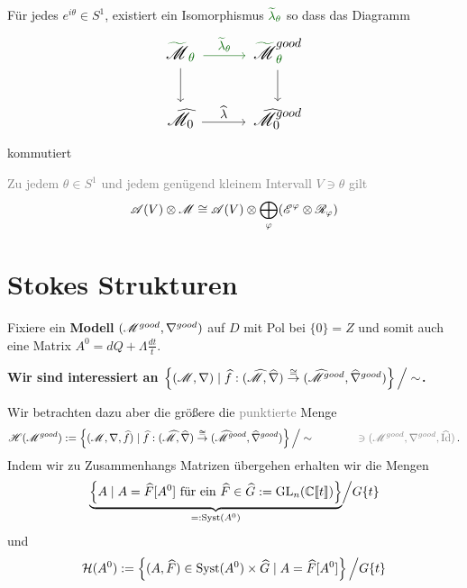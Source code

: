 \begin{paracol}{2} %
  \begin{thm}
    Für jedes $e^{i\theta}\in S^1$, existiert ein Isomorphismus
    $\textcolor{green!40!black}{\tilde\lambda_\theta}$ so dass das Diagramm
    \[ \Large\begin{tikzcd}
        \textcolor{green!40!black}{\tilde{\textcolor{black}{\sM}}_\theta}
        \dar \rar[green!40!black]{\tilde\lambda_\theta}&
        \textcolor{green!40!black}{%
        \tilde{\textcolor{black}{\sM}}_\theta^{\textcolor{black}{good}}}\dar
        \\\hat\sM_0 \rar{\hat\lambda} &
        \hat\sM_0^{good}
    \end{tikzcd} \]
    kommutiert
  \end{thm}
\switchcolumn %
\begin{thm}
  \textcolor{gray}{%
    Zu jedem $\theta\in S^1$ und jedem genügend kleinem Intervall $V\ni\theta$
    gilt
    \[
      \mathscr{A}(V)\otimes\mathscr{M}\cong\mathscr{A}(V)\otimes\bigoplus_\varphi(\mathscr{E}^\varphi\otimes\mathscr{R}_\varphi)
    \]
  }
\end{thm}
\end{paracol} %
\section{Stokes Strukturen} %
Fixiere ein \textbf{Modell} $(\mathscr{M}^{good},\nabla^{good})$ auf $D$ mit Pol bei
$\{0\}=Z$ und somit auch eine Matrix $A^0=dQ+\Lambda\frac{dt}{t}$.

\begin{center}
  \textbf{Wir sind interessiert an
    $\left\{(\mathscr{M},\nabla)
        \mid \widehat f:(\widehat{\mathscr{M}},\widehat\nabla)
          \overset{\cong}\to
          (\widehat{\mathscr{M}}^{good},\widehat\nabla^{good})
      \right\}\Big/\sim$.}
\end{center}
Wir betrachten dazu aber die größere die \textcolor{gray}{punktierte} Menge
\[
  \sH(\sM^{good}):=\left\{(\sM,\nabla,\hat f)
      \mid \hat f:(\hat\sM,\hat\nabla)
        \overset{\cong}\to
        (\hat\sM^{good},\hat\nabla^{good})
    \right\}\Big/\sim
    \qquad \qquad
    \textcolor{gray}{\ni (\sM^{good},\nabla^{good},\hat \Id)}\,.
\]
Indem wir zu Zusammenhangs Matrizen übergehen erhalten wir die Mengen
\[
  \underset{=:\Syst(A^0)}{\underbrace{%
      \left\{A \mid A=\hat F[A^0]\text{~für ein~}\hat F\in\hat G
      :=\GL_n(\C\llbracket t\rrbracket)\right\}
  }}\Big/G\{t\}
\]
und
\[
  \mathcal{H}(A^0):=\left\{
      (A,\widehat F)\in\operatorname{Syst}(A^0)\times\widehat G\mid A=\widehat F[A^0]
    \right\}\Big/G\{t\}
\]


